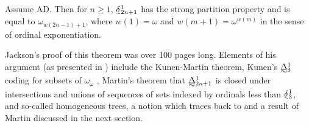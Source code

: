 \documentclass{book}%
\newcommand{\breals}{{^{\omega}}\omega}
\def\underTilde#1{{\baselineskip=0pt\vtop{\hbox{$#1$}\hbox{$\sim$}}}{}}
\def\undertilde#1{{\baselineskip=0pt\vtop
  {\hbox{$#1$}\hbox{$\scriptscriptstyle\sim$}}}{}}
\newcommand{\uTDelta}{\underTilde{\Delta}}
\newcommand{\utdelta}{\undertilde{\delta}}
\begin{document}
\begin{theorem} Assume {\rm AD}. Then for $n\geq 1$,
$\undertilde{\delta}^{1}_{2n+1}$ has the strong partition property and is equal to $\omega_{w(2n-1) + 1}$, where $w(1)
= \omega$ and $w(m+1) = \omega^{w(m)}$ in the sense of ordinal
exponentiation.
\end{theorem}


Jackson's proof of this theorem was over 100 pages long. Elements of his argument (as presented in \cite{Jackson:1999}) include the Kunen-Martin theorem, Kunen's $\uTDelta^{1}_{3}$
coding for subsets of $\omega_{\omega}$ \cite{Solovay:1978}, Martin's theorem that $\uTDelta^{1}_{2n+1}$ is closed under
intersections and unions of sequences of sets indexed by ordinals less than $\utdelta^{1}_{3}$, and so-called homogeneous trees, a notion which traces back to \cite{MartinSolovay:1969} and a result of Martin discussed in the next section.









\end{document}
